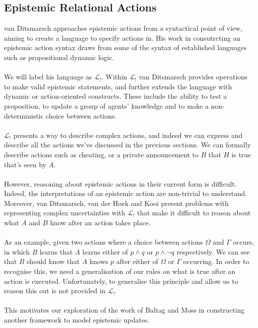 \documentclass[10pt, a4paper, twoside]{article}
\begin{document}
\subsection{Epistemic Relational Actions} \label{epi_acts}
van Ditsmarsch approaches epistemic actions from a syntactical point of view,
aiming to create a language to specify actions in.
His work in consutrcting an epistemic action syntax draws from some of the
syntax of established languages such as propositional dynamic logic.\\
\\
We will label his language as $\mathcal{L}_{!}$.
Within $\mathcal{L}_{!}$ van Ditsmarsch provides operations to make valid
epistemic statements, and further extends the language with dynamic or
action-oriented constructs.
These include the ability to test a proposition, to update a group of agents'
knowledge and to make a non-deterministic choice between actions.\\
\\
$\mathcal{L}_{!}$ presents a way to describe complex actions, and indeed we can
express and describe all the actions we've discussed in the previous sections.
We can formally describe actions such as cheating, or a private
announcement to $B$ that $H$ is true that's seen by $A$.\\
\\
However, reasoning about epistemic actions in their current form is difficult.
Indeed, the interpretations of an epistemic action are non-trivial to
understand.
Moreover, van Ditsmarsch, van der Hoek and Kooi present problems with
representing complex uncertainties with $\mathcal{L}_{!}$ that make it difficult
to reason about what $A$ and $B$ know after an action takes place.\\
\\
As an example, given two actions where a choice between actions $\Omega$ and
$\Gamma$ occurs, in which $B$ learns that $A$ learns either of $p \land q$ or
$p \land \neg q$ respectively.
We can see that $B$ should know that $A$ knows $p$ after either of $\Omega$ or
$\Gamma$ occurring.
In order to recognise this, we need a generalisation of our rules on what is
true after an action is executed.
Unfortunately, to generalise this principle and allow us to reason this out is
not provided in $\mathcal{L}_{!}$.\\
\\
This motivates our exploration of the work of Baltag and Moss in constructing
another framework to model epistemic updates.
\end{document}
